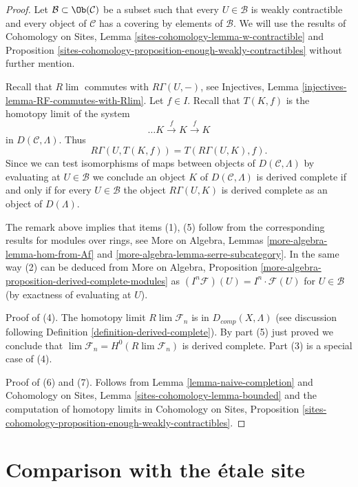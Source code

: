 \begin{proof}
Let $\mathcal{B} \subset \Ob(\mathcal{C})$ be a subset such that every
$U \in \mathcal{B}$ is weakly contractible and every object of $\mathcal{C}$
has a covering by elements of $\mathcal{B}$.
We will use the results of Cohomology on Sites,
Lemma \ref{sites-cohomology-lemma-w-contractible} and
Proposition \ref{sites-cohomology-proposition-enough-weakly-contractibles}
without further mention.

\medskip\noindent
Recall that $R\lim$ commutes with $R\Gamma(U, -)$,
see Injectives, Lemma \ref{injectives-lemma-RF-commutes-with-Rlim}.
Let $f \in I$. Recall that $T(K, f)$ is the homotopy limit
of the system
$$
\ldots K \xrightarrow{f} K \xrightarrow{f} K
$$
in $D(\mathcal{C}, \Lambda)$. Thus
$$
R\Gamma(U, T(K, f)) = T(R\Gamma(U, K), f).
$$
Since we can test isomorphisms of maps between objects of
$D(\mathcal{C}, \Lambda)$ by evaluating at $U \in \mathcal{B}$
we conclude an object $K$ of $D(\mathcal{C}, \Lambda)$
is derived complete if and only if for every $U \in \mathcal{B}$ the
object $R\Gamma(U, K)$ is derived complete as an object of $D(\Lambda)$.

\medskip\noindent
The remark above implies that items (1), (5) follow from the corresponding
results for modules over rings, see
More on Algebra, Lemmas \ref{more-algebra-lemma-hom-from-Af} and
\ref{more-algebra-lemma-serre-subcategory}.
In the same way (2) can be deduced from
More on Algebra, Proposition
\ref{more-algebra-proposition-derived-complete-modules}
as $(I^n\mathcal{F})(U) = I^n \cdot \mathcal{F}(U)$
for $U \in \mathcal{B}$ (by exactness of evaluating at $U$).

\medskip\noindent
Proof of (4). The homotopy limit $R\lim \mathcal{F}_n$ is in
$D_{comp}(X, \Lambda)$ (see discussion following
Definition \ref{definition-derived-complete}).
By part (5) just proved we conclude that
$\lim \mathcal{F}_n = H^0(R\lim \mathcal{F}_n)$
is derived complete.
Part (3) is a special case of (4).

\medskip\noindent
Proof of (6) and (7). Follows from
Lemma \ref{lemma-naive-completion}
and
Cohomology on Sites, Lemma \ref{sites-cohomology-lemma-bounded}
and the computation of homotopy limits in Cohomology on Sites,
Proposition \ref{sites-cohomology-proposition-enough-weakly-contractibles}.
\end{proof}





\section{Comparison with the \'etale site}
\label{section-comparison}

